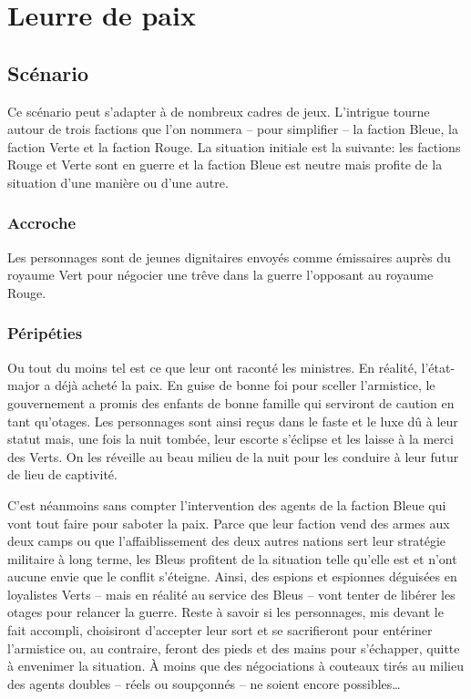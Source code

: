 \chapter{Leurre de paix}

\section{Scénario}

Ce scénario peut s'adapter à de nombreux cadres de jeux.
L'intrigue tourne autour de trois factions que l'on nommera -- pour simplifier -- la faction Bleue, la faction Verte et la faction Rouge.
La situation initiale est la suivante: les factions Rouge et Verte sont en guerre et la faction Bleue est \og neutre \fg mais profite de la situation d'une manière ou d'une autre.

\subsection{Accroche}

Les personnages sont de jeunes dignitaires envoyés comme émissaires auprès du royaume Vert pour négocier une trêve dans la guerre l'opposant au royaume Rouge.

\subsection{Péripéties}

Ou tout du moins tel est ce que leur ont raconté les ministres.
En réalité, l'état-major a déjà acheté la paix.
En guise de bonne foi pour sceller l'armistice, le gouvernement a promis des enfants de bonne famille qui serviront de \og caution \fg en tant qu'otages.
Les personnages sont ainsi reçus dans le faste et le luxe dû à leur statut mais, une fois la nuit tombée, leur escorte s'éclipse et les laisse à la merci des Verts.
On les réveille au beau milieu de la nuit pour les conduire à leur futur de lieu de captivité.

C'est néanmoins sans compter l'intervention des agents de la faction Bleue qui vont tout faire pour saboter la paix.
Parce que leur faction vend des armes aux deux camps ou que l'affaiblissement des deux autres nations sert leur stratégie militaire à long terme, les Bleus profitent de la situation telle qu'elle est et n'ont aucune envie que le conflit s'éteigne.
Ainsi, des espions et espionnes déguisées en loyalistes Verts -- mais en réalité au service des Bleus -- vont tenter de libérer les otages pour relancer la guerre.
Reste à savoir si les personnages, mis devant le fait accompli, choisiront d'accepter leur sort et se sacrifieront pour entériner l'armistice ou, au contraire, feront des pieds et des mains pour s'échapper, quitte à envenimer la situation.
À moins que des négociations à couteaux tirés au milieu des agents doubles -- réels ou soupçonnés -- ne soient encore possibles\dots

